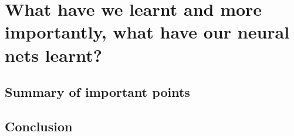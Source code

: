 
\chapter{What have we learnt and more importantly, what have our neural nets learnt?} %

\label{Chapter7} %



\section{Summary of important points}

\section{Conclusion}

